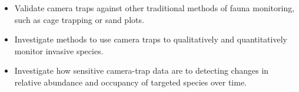 \documentclass[version=last, paper=a4, DIV=18, usenames, dvipsnames]{scrartcl}
\begin{document}
\begin{itemize}

  \item Validate camera traps against other traditional methods of fauna monitoring, such as cage trapping or sand plots.

  \item Investigate methods to use camera traps to qualitatively and quantitatively monitor invasive species.

  \item Investigate how sensitive camera-trap data are to detecting changes in relative abundance and occupancy of targeted species over time.

\end{itemize}






\clearpage
\end{document}
